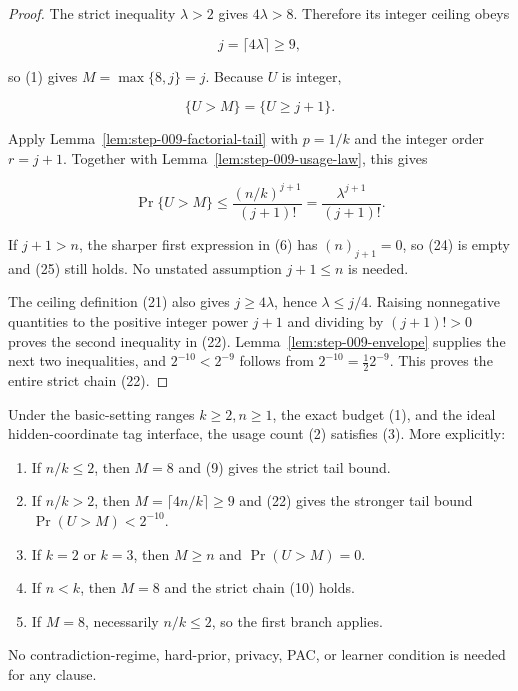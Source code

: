 \begin{proof}
The strict inequality \(\lambda>2\) gives \(4\lambda>8\). Therefore its
integer ceiling obeys

\[
j=\lceil4\lambda\rceil\ge9,
\tag{23}
\]

so (1) gives \(M=\max\{8,j\}=j\). Because \(U\) is integer,

\[
\{U>M\}=\{U\ge j+1\}.
\tag{24}
\]

Apply Lemma~\ref{lem:step-009-factorial-tail} with
\(p=1/k\) and the integer order \(r=j+1\). Together with
Lemma~\ref{lem:step-009-usage-law}, this gives

\[
\Pr\{U>M\}
\le\frac{(n/k)^{j+1}}{(j+1)!}
=\frac{\lambda^{j+1}}{(j+1)!}.
\tag{25}
\]

If \(j+1>n\), the sharper first expression in (6) has
\((n)_{j+1}=0\), so (24) is empty and (25) still holds. No unstated
assumption \(j+1\le n\) is needed.

The ceiling definition (21) also gives \(j\ge4\lambda\), hence
\(\lambda\le j/4\). Raising nonnegative quantities to the positive integer
power \(j+1\) and dividing by \((j+1)!>0\) proves the second inequality in
(22). Lemma~\ref{lem:step-009-envelope} supplies the next two inequalities,
and \(2^{-10}<2^{-9}\) follows from \(2^{-10}=\tfrac12 2^{-9}\).
This proves the entire strict chain (22). \end{proof}

\begin{proposition}\label{prop:step-009-overflow}
Under the basic-setting ranges \(k\ge2,n\ge1\), the exact budget (1), and
the ideal hidden-coordinate tag interface, the usage count (2)
satisfies (3). More explicitly:

\begin{enumerate}
\item If \(n/k\le2\), then \(M=8\) and (9) gives the strict tail bound.
\item If \(n/k>2\), then \(M=\lceil4n/k\rceil\ge9\) and (22) gives the
stronger tail bound \(\Pr(U>M)<2^{-10}\).
\item If \(k=2\) or \(k=3\), then \(M\ge n\) and \(\Pr(U>M)=0\).
\item If \(n<k\), then \(M=8\) and the strict chain (10) holds.
\item If \(M=8\), necessarily \(n/k\le2\), so the first branch applies.
\end{enumerate}

No contradiction-regime, hard-prior, privacy, PAC, or learner condition is
needed for any clause.
\end{proposition}

